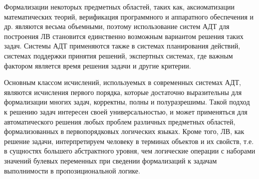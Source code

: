 \documentclass[a4paper]{report}
\begin{document}
Формализации некоторых предметных областей, таких как, аксиоматизации математических теорий, верификация программного и аппаратного обеспечения и др. являются весьма объемными, поэтому использование систем АДТ для построения ЛВ становится единственно возможным вариантом решения таких задач. Системы АДТ применяются также в системах планирования действий, системах поддержки принятия решений, экспертных системах, где важным фактором является время решения задачи и другие критерии.



Основным классом исчислений, используемых в современных системах АДТ, являются исчисления первого порядка, которые достаточно выразительны для формализации многих задач, корректны, полны и полуразрешимы. Такой подход к решению задач интересен своей универсальностью, и может применяться для автоматического решения любых проблем различных предметных областей, формализованных в первопорядковых логических языках. Кроме того, ЛВ, как решение задачи, интерпретируем человеку в терминах объектов и их свойств, т.е. в сущностях большего абстрактного уровня, чем  логические операции с наборами значений булевых переменных при сведении формализаций к задачам выполнимости в пропозициональной логике.

\end{document}
